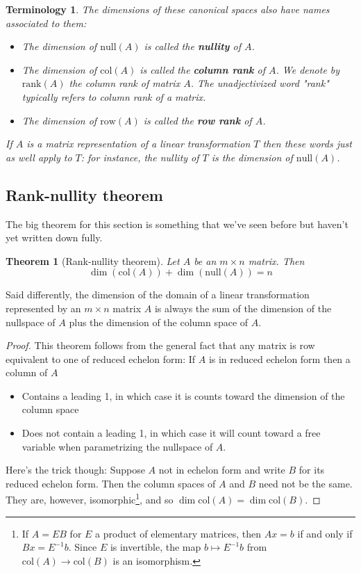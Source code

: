 \documentclass[12pt]{article}
\numberwithin{equation}{subsection}
\numberwithin{figure}{subsection}
\newtheorem{thm}[subsection]{Theorem}
\theoremstyle{note}
\newtheorem{terminology}[subsection]{Terminology}
\newcommand\nul[1]{\mathrm{null}(#1)}
\newcommand\col[1]{\mathrm{col}(#1)}
\newcommand\row[1]{\mathrm{row}(#1)}
\newcommand\rank[1]{\mathrm{rank}(#1)}
\begin{document}
\begin{terminology} 
	The dimensions of these canonical spaces also have names associated to them: 
	\begin{itemize}
		\item The dimension of $\nul{A}$ is called the \textbf{nullity} of $A$.
		\item The dimension of $\col{A}$ is called the \textbf{column rank} of $A$. We denote by $\rank{A}$ the \textit{column} rank of matrix $A$. The unadjectivized word "rank" typically refers to column rank of a matrix.
		\item The dimension of $\row{A}$ is called the \textbf{row rank} of $A$.
	\end{itemize}
	If $A$ is a matrix representation of a linear transformation $T$ then these words just as well apply to $T$: for instance, the nullity of $T$ is the dimension of $\nul{A}$. 
\end{terminology}

\subsection{Rank-nullity theorem} 
The big theorem for this section is something that we've seen before but haven't yet written down fully. 

\begin{thm}[Rank-nullity theorem]
	Let $A$ be an $m\times n$ matrix. Then \begin{equation} \dim(\col{A})+\dim(\nul{A})=n\end{equation}
\end{thm}

Said differently, the dimension of the domain of a linear transformation represented by an $m\times n$ matrix $A$ is always the sum of the dimension of the nullspace of $A$ plus the dimension of the column space of $A$. 

\begin{proof}
This theorem follows from the general fact that any matrix is row equivalent to one of reduced echelon form: If $A$ is in reduced echelon form then a column of $A$ 
\begin{itemize}
	\item Contains a leading 1, in which case it is counts toward the dimension of the column space
	\item Does not contain a leading 1, in which case it will count toward a free variable when parametrizing the nullspace of $A$.
\end{itemize}
Here's the trick though: Suppose $A$ not in echelon form and write $B$ for its reduced echelon form. Then the column spaces of $A$ and $B$ need not be the same. They are, however, isomorphic\footnote{If $A=EB$ for $E$ a product of elementary matrices, then $Ax=b$ if and only if $Bx=E^{-1}b$. Since $E$ is invertible, the map $b\mapsto E^{-1}b$ from $\col{A}\to\col{B}$ is an isomorphism.}, and so $\dim{\col{A}}=\dim{\col{B}}$. 
\end{proof}
\end{document}

